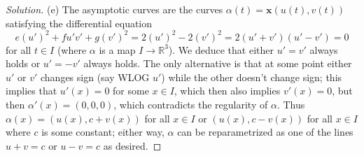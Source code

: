 \documentclass[10pt]{scrartcl}
\providecommand{\RR}{\mathbb R}
\providecommand{\mb}[1]{\mathbf{#1}}
\newenvironment{soln}{\begin{proof}[Solution]}{\end{proof}}
\begin{document}
\begin{soln}
	(e) The asymptotic curves are the curves $\alpha(t) = \mb x(u(t), v(t))$
	satisfying the differential equation
	\[e(u')^2 + fu'v' + g(v')^2 = 2(u')^2 - 2(v')^2 =
	2(u'+v')(u'-v') = 0\]
	for all $t\in I$ (where $\alpha$ is a map $I\to\RR^3$).
	We deduce that either $u' = v'$ always holds or $u' = -v'$ always holds.
	The only alternative is that at some point either $u'$ or $v'$
	changes sign (say WLOG $u'$) while the other doesn't change sign;
	this implies that $u'(x) = 0$ for some $x\in I$,
	which then also implies $v'(x) = 0$, but then
	$\alpha'(x) = (0,0,0)$, which contradicts the regularity of $\alpha$.
	Thus $\alpha(x) = (u(x), c + v(x))$ for all $x\in I$
	or $(u(x), c - v(x))$ for all $x\in I$ where $c$ is some constant;
	either way, $\alpha$ can be reparametrized as
	one of the lines $u+v=c$ or $u-v=c$ as desired.
\end{soln}
\end{document}
